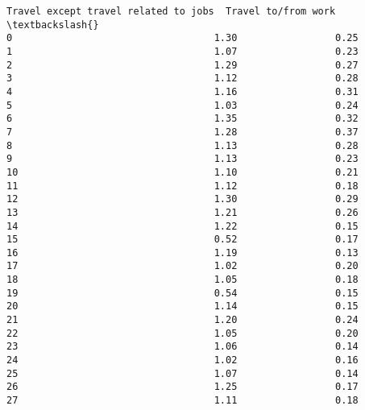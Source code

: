 \documentclass[11pt]{article}
\begin{document}
\begin{Verbatim}[commandchars=\\\{\}]
    Travel except travel related to jobs  Travel to/from work  \textbackslash{}
0                                   1.30                 0.25   
1                                   1.07                 0.23   
2                                   1.29                 0.27   
3                                   1.12                 0.28   
4                                   1.16                 0.31   
5                                   1.03                 0.24   
6                                   1.35                 0.32   
7                                   1.28                 0.37   
8                                   1.13                 0.28   
9                                   1.13                 0.23   
10                                  1.10                 0.21   
11                                  1.12                 0.18   
12                                  1.30                 0.29   
13                                  1.21                 0.26   
14                                  1.22                 0.15   
15                                  0.52                 0.17   
16                                  1.19                 0.13   
17                                  1.02                 0.20   
18                                  1.05                 0.18   
19                                  0.54                 0.15   
20                                  1.14                 0.15   
21                                  1.20                 0.24   
22                                  1.05                 0.20   
23                                  1.06                 0.14   
24                                  1.02                 0.16   
25                                  1.07                 0.14   
26                                  1.25                 0.17   
27                                  1.11                 0.18   


\end{Verbatim}
\end{document}
